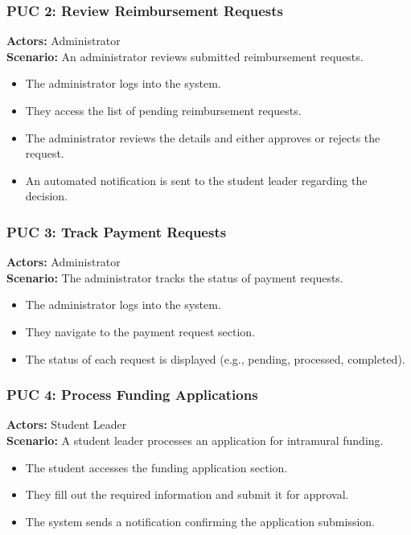 \documentclass[12pt]{article}
\begin{document}
\subsubsection{PUC 2: Review Reimbursement Requests}
\textbf{Actors:} Administrator \\
\textbf{Scenario:} An administrator reviews submitted reimbursement requests.
\begin{itemize}
    \item The administrator logs into the system.
    \item They access the list of pending reimbursement requests.
    \item The administrator reviews the details and either approves or rejects the request.
    \item An automated notification is sent to the student leader regarding the decision.
\end{itemize}

\subsubsection{PUC 3: Track Payment Requests}
\textbf{Actors:} Administrator \\
\textbf{Scenario:} The administrator tracks the status of payment requests.
\begin{itemize}
    \item The administrator logs into the system.
    \item They navigate to the payment request section.
    \item The status of each request is displayed (e.g., pending, processed, completed).
\end{itemize}

\subsubsection{PUC 4: Process Funding Applications}
\textbf{Actors:} Student Leader \\
\textbf{Scenario:} A student leader processes an application for intramural funding.
\begin{itemize}
    \item The student accesses the funding application section.
    \item They fill out the required information and submit it for approval.
    \item The system sends a notification confirming the application submission.
\end{itemize}
\end{document}
